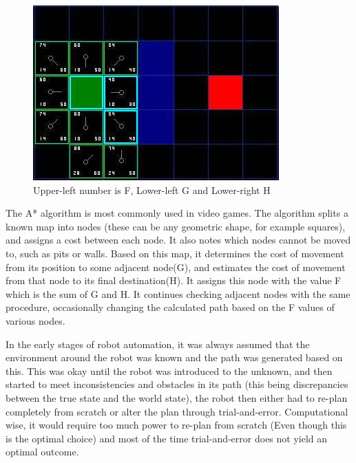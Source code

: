 \begin{figure}[H]
	\centering
	\includegraphics[width=.7\linewidth]{images/aStar2.jpg}
	\caption{Upper-left number is F, Lower-left G and Lower-right H}
	\label{fig:sub2}
\end{figure}

The A* algorithm is most commonly used in video games. The algorithm splits a known map into nodes (these can be any geometric shape, for example squares), and assigns a cost between each node. It also notes which nodes cannot be moved to, such as pits or walls. Based on this map, it determines the cost of movement from its position to some adjacent node(G), and estimates the cost of movement from that node to its final destination(H). It assigns this node with the value F which is the sum of G and H. It continues checking adjacent nodes with the same procedure, occasionally changing the calculated path based on the F values of various nodes\cite{astar}.

In the early stages of robot automation, it was always assumed that the environment around the robot was known and the path was generated based on this. This was okay until the robot was introduced to the unknown, and then started to meet inconsistencies and obstacles in its path (this being discrepancies between the true state and the world state), the robot then either had to re-plan completely from scratch or alter the plan through trial-and-error. Computational wise, it would require too much power to re-plan from scratch (Even though this is the optimal choice) and most of the time trial-and-error does not yield an optimal outcome.

